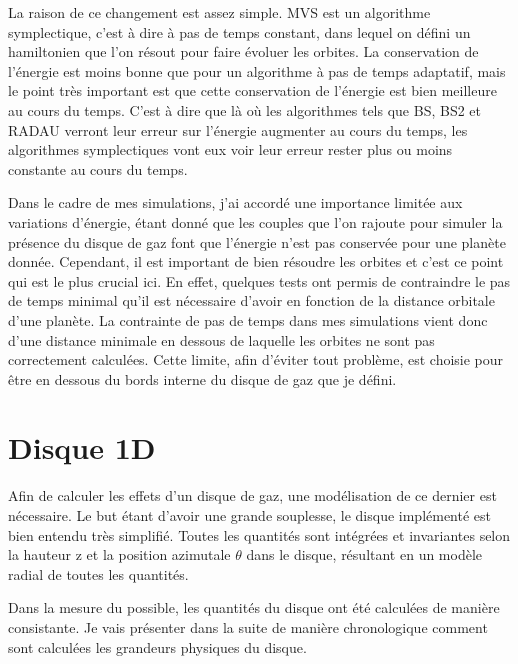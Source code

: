 La raison de ce changement est assez simple. MVS est un algorithme symplectique, c'est à dire à pas de temps constant, dans lequel on défini un hamiltonien que l'on résout pour faire évoluer les orbites. La conservation de l'énergie est moins bonne que pour un algorithme à pas de temps adaptatif, mais le point très important est que cette conservation de l'énergie est bien meilleure au cours du temps. C'est à dire que là où les algorithmes tels que BS, BS2 et RADAU verront leur erreur sur l'énergie augmenter au cours du temps, les algorithmes symplectiques vont eux voir leur erreur rester plus ou moins constante au cours du temps. 

Dans le cadre de mes simulations, j'ai accordé une importance limitée aux variations d'énergie, étant donné que les couples que l'on rajoute pour simuler la présence du disque de gaz font que l'énergie n'est pas conservée pour une planète donnée. Cependant, il est important de bien résoudre les orbites et c'est ce point qui est le plus crucial ici. En effet, quelques tests ont permis de contraindre le pas de temps minimal qu'il est nécessaire d'avoir en fonction de la distance orbitale d'une planète. La contrainte de pas de temps dans mes simulations vient donc d'une distance minimale en dessous de laquelle les orbites ne sont pas correctement calculées. Cette limite, afin d'éviter tout problème, est choisie pour être en dessous du bords interne du disque de gaz que je défini.



\section{Disque 1D}
Afin de calculer les effets d'un disque de gaz, une modélisation de ce dernier est nécessaire. Le but étant d'avoir une grande souplesse, le disque implémenté est bien entendu très simplifié. Toutes les quantités sont intégrées et invariantes selon la hauteur z et la position azimutale $\theta$ dans le disque, résultant en un modèle radial de toutes les quantités. 

Dans la mesure du possible, les quantités du disque ont été calculées de manière consistante. Je vais présenter dans la suite de manière chronologique comment sont calculées les grandeurs physiques du disque.

